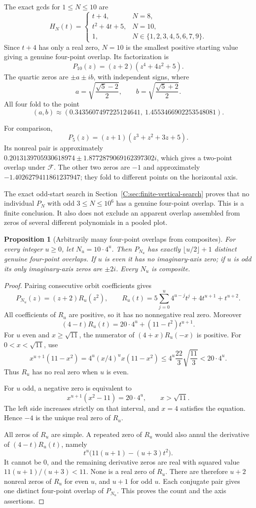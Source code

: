 \documentclass[11pt,a4paper]{article}
\newtheorem{proposition}[theorem]{Proposition}
\theoremstyle{definition}
\theoremstyle{remark}
\numberwithin{equation}{section}
\begin{document}
The exact gcds for $1\leq N\leq10$ are
\[
 H_N(t)=
 \begin{cases}
 t+4,&N=8,\\
 t^2+4t+5,&N=10,\\
 1,&N\in\{1,2,3,4,5,6,7,9\}.
 \end{cases}
\]
Since $t+4$ has only a real zero, $N=10$ is the smallest positive
starting value giving a genuine four-point overlap. Its factorization is
\[
 P_{10}(z)=(z+2)(z^4+4z^2+5).
\]
The quartic zeros are $\pm a\pm ib$, with independent signs, where
\[
 a=\sqrt{\frac{\sqrt5-2}{2}},\qquad
 b=\sqrt{\frac{\sqrt5+2}{2}}.
\]
All four fold to the point
\[
 (a,b)\approx(0.3435607497225124641,\ 1.4553466902253548081).
\]

For comparison,
\[
 P_5(z)=(z+1)(z^3+z^2+3z+5).
\]
Its nonreal pair is approximately
$0.2013139705930618974\pm1.8772879069162397302i$,
which gives a two-point overlap under $\mathcal F$. The other two zeros
are $-1$ and approximately $-1.4026279411861237947$; they fold to
different points on the horizontal axis.

The exact odd-start search in Section~\ref{C:sec:finite-vertical-search}
proves that no individual $P_N$ with odd $3\leq N\leq10^6$ has a
genuine four-point overlap. This is a finite conclusion. It also does
not exclude an apparent overlap assembled from zeros of several
different polynomials in a pooled plot.

\begin{proposition}[Arbitrarily many four-point overlaps from composites]
For every integer $u\geq0$, let $N_u=10\cdot4^u$. Then $P_{N_u}$ has
exactly $\lfloor u/2\rfloor+1$ distinct genuine four-point overlaps.
If $u$ is even it has no imaginary-axis zero; if $u$ is odd its only
imaginary-axis zeros are $\pm2i$. Every $N_u$ is composite.
\end{proposition}
\begin{proof}
Pairing consecutive orbit coefficients gives
\[
 P_{N_u}(z)=(z+2)R_u(z^2),\qquad
 R_u(t)=5\sum_{j=0}^{u}4^{u-j}t^j+4t^{u+1}+t^{u+2}.
\]
All coefficients of $R_u$ are positive, so it has no nonnegative
real zero. Moreover
\[
 (4-t)R_u(t)=20\cdot4^u+(11-t^2)t^{u+1}.
\]
For $u$ even and $x\geq\sqrt{11}$, the numerator of
$(4+x)R_u(-x)$ is positive. For $0<x<\sqrt{11}$, use
\[
 x^{u+1}(11-x^2)
 =4^u(x/4)^u x(11-x^2)
 \leq4^u\frac{22}{3}\sqrt{\frac{11}{3}}
 <20\cdot4^u.
\]
Thus $R_u$ has no real zero when $u$ is even.

For $u$ odd, a negative zero is equivalent to
\[
 x^{u+1}(x^2-11)=20\cdot4^u,
 \qquad x>\sqrt{11}.
\]
The left side increases strictly on that interval, and $x=4$ satisfies
the equation. Hence $-4$ is the unique real zero of $R_u$.

All zeros of $R_u$ are simple. A repeated zero of $R_u$ would also
annul the derivative of $(4-t)R_u(t)$, namely
\[
 t^u\bigl(11(u+1)-(u+3)t^2\bigr).
\]
It cannot be $0$, and the remaining derivative zeros are real with
squared value $11(u+1)/(u+3)<11$. None is a real zero of $R_u$.
There are therefore $u+2$ nonreal zeros of $R_u$ for even $u$, and
$u+1$ for odd $u$. Each conjugate pair gives one distinct four-point
overlap of $P_{N_u}$. This proves the count and the axis assertions.
\end{proof}
\end{document}
